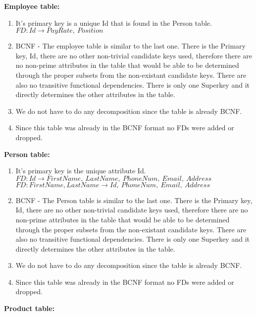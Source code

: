 \documentclass{article}
\begin{document}
  \par\textbf{Employee table:}
  \begin{enumerate}[label=\roman*]
  	\item It's primary key is a unique Id that is found in the Person table. \newline
    $FD: Id \rightarrow PayRate,\ Position$
  	\item BCNF - The employee table is similar to the last one. There is the Primary key, Id, there are no other non-trivial candidate keys used, therefore there are no non-prime attributes in the table that would be able to be determined through the proper subsets from the non-existant candidate keys. There are also no transitive functional dependencies. There is only one Superkey and it directly determines the other attributes in the table.
  	\item We do not have to do any decomposition since the table is already BCNF.
  	\item Since this table was already in the BCNF format no FDs were added or dropped.
  \end{enumerate}
  \par\textbf{Person table:}
  \begin{enumerate}[label=\roman*]
  	\item It's primary key is the unique attribute Id. \newline
    $FD: Id \rightarrow FirstName,\ LastName,\ PhoneNum,\ Email,\ Address$\newline
    $FD: FirstName, LastName \rightarrow Id,\ PhoneNum,\ Email,\ Address$
  	\item BCNF - The Person table is similar to the last one. There is the Primary key, Id, there are no other non-trivial candidate keys used, therefore there are no non-prime attributes in the table that would be able to be determined through the proper subsets from the non-existant candidate keys. There are also no transitive functional dependencies. There is only one Superkey and it directly determines the other attributes in the table.
  	\item We do not have to do any decomposition since the table is already BCNF.
  	\item Since this table was already in the BCNF format no FDs were added or dropped.
  \end{enumerate}
  \par\textbf{Product table:}
\end{document}
